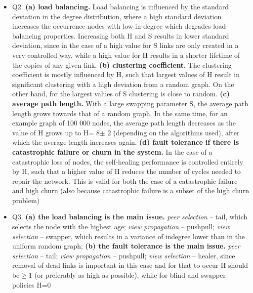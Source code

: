 \documentclass[10pt]{proc}
\begin{document}
\begin{itemize}
\item Q2. %
 \textbf{(a) load balancing.}
Load balancing is influenced by the standard deviation in the degree distribution, where a high standard deviation increases the occurrence nodes with low in-degree which degrades load-balancing properties. Increasing both H and S results in lower standard deviation, since in the case of a high value for S links are only created in a very controlled way, while a high value for H results in a shorter lifetime of the copies of any given link.
\newline \textbf{(b) clustering coefficient.}
The clustering coefficient is mostly influenced by H, such that largest values of H result in significant clustering with a high deviation from a random graph. On the other hand, for the largest values of S clustering is close to random.
\newline \textbf{(c) average path length.}
With a large swapping parameter S, the average path length grows towards that of a random graph. In the same time, for an example graph of 100 000 nodes, the average path length decreases as the value of H grows up to H= 8$\pm$ 2 (depending on the algorithms used), after which the average length increases again.
\newline  \textbf{(d) fault tolerance if there is catastrophic failure or churn in the system.}
In the case of a catastrophic loss of nodes, the self-healing performance is controlled
entirely by H, such that a higher value of H reduces the number of cycles needed to repair the network. This is valid for both the case of a catastrophic failure and high churn (also because catastrophic failure is a subset of the high churn problem)

\item Q3. %
\textbf{(a) the load balancing is the main issue.}
\newline \emph{peer selection} -- tail, which selects the node with the highest age;
\newline \emph{view propagation} -- pushpull;
\newline \emph{view selection} -- swapper, which results in a variance of indegree lower than in the uniform random graph;
 \newline \textbf{(b) the fault tolerance is the main issue.}
\newline \emph{peer selection} -- tail;
\emph{view propagation} -- pushpull; \emph{view selection} -- healer, since removal of dead links is important in this case and for that to occur H should be$\geq$1 (or preferably as high as possible), while for blind and swapper policies H=0


\end{itemize}



\end{document}
